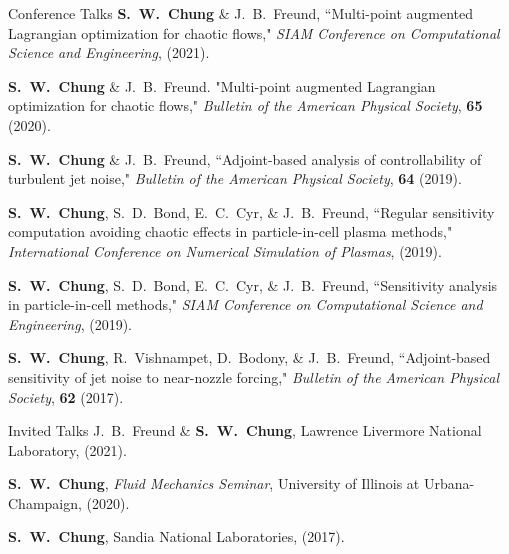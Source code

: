 \documentclass{resume} %
\begin{document}
\clearpage
\begin{rSection}{Conference Talks}
\textbf{S.\ W.\ Chung} \& J.\ B.\ Freund, ``Multi-point augmented Lagrangian optimization for chaotic flows,"
\textit{SIAM Conference on Computational Science and Engineering}, (2021).

\par
\textbf{S.\ W.\ Chung} \& J.\ B.\ Freund. "Multi-point augmented Lagrangian optimization for chaotic flows,"
\textit{Bulletin of the American Physical Society}, \textbf{65} (2020).

\par
\textbf{S.\ W.\ Chung} \& J.\ B.\ Freund,
``Adjoint­-based analysis of controllability of turbulent jet noise,"
\textit{Bulletin of the American Physical Society}, \textbf{64} (2019).

\par
\textbf{S.\ W.\ Chung}, S.\ D.\ Bond, E.\ C.\ Cyr, \& J.\ B.\ Freund,
``Regular sensitivity computation avoiding chaotic effects in particle-in-cell plasma methods,"
\textit{International Conference on Numerical Simulation of Plasmas}, (2019).

\par
\textbf{S.\ W.\ Chung}, S.\ D.\ Bond, E.\ C.\ Cyr, \& J.\ B.\ Freund, ``Sensitivity analysis in particle-in-cell methods,"
\textit{SIAM Conference on Computational Science and Engineering}, (2019).

\par
\textbf{S.\ W.\ Chung}, R.\ Vishnampet, D.\ Bodony, \& J.\ B.\ Freund, ``Adjoint-based sensitivity of jet noise to near-nozzle forcing,"
\textit{Bulletin of the American Physical Society}, \textbf{62} (2017).
\end{rSection}

\begin{rSection}{Invited Talks}
J.\ B.\ Freund \& \textbf{S.\ W.\ Chung}, Lawrence Livermore National Laboratory, (2021).
\par
\textbf{S.\ W.\ Chung}, \textit{Fluid Mechanics Seminar}, University of Illinois at Urbana-Champaign, (2020).
\par
\textbf{S.\ W.\ Chung}, Sandia National Laboratories, (2017).
\end{rSection}

\end{document}
